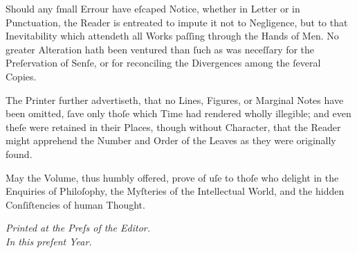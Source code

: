 \documentclass[12pt]{article}
\begin{document}
Should any ſmall Errour have eſcaped Notice, whether in Letter or in 
Punctuation, the Reader is entreated to impute it not to Negligence, but to 
that Inevitability which attendeth all Works paſſing through the Hands of 
Men. No greater Alteration hath been ventured than ſuch as was neceſſary 
for the Preſervation of Senſe, or for reconciling the Divergences among the 
ſeveral Copies.

The Printer further advertiseth, that no Lines, Figures, or Marginal Notes 
have been omitted, ſave only thoſe which Time had rendered wholly 
illegible; and even theſe were retained in their Places, though without 
Character, that the Reader might apprehend the Number and Order of the 
Leaves as they were originally found.

May the Volume, thus humbly offered, prove of uſe to thoſe who delight in 
the Enquiries of Philoſophy, the Myſteries of the Intellectual World, and 
the hidden Conſiſtencies of human Thought.

\begin{flushright}
\textit{Printed at the Preſs of the Editor.}\\
\textit{In this preſent Year.}
\end{flushright}

\end{document}
